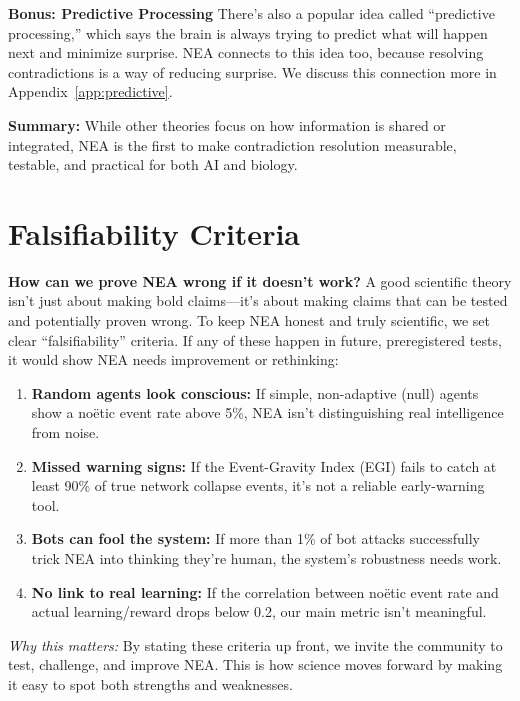 \documentclass[11pt]{article}
\begin{document}
\textbf{Bonus: Predictive Processing}  
There’s also a popular idea called “predictive processing,” which says the brain is always trying to predict what will happen next and minimize surprise. NEA connects to this idea too, because resolving contradictions is a way of reducing surprise. We discuss this connection more in Appendix~\ref{app:predictive}.

\textbf{Summary:}  
While other theories focus on how information is shared or integrated, NEA is the first to make contradiction resolution measurable, testable, and practical for both AI and biology.



\section{Falsifiability Criteria}
\label{sec:falsify}

\textbf{How can we prove NEA wrong if it doesn’t work?}  
A good scientific theory isn’t just about making bold claims—it’s about making claims that can be tested and potentially proven wrong. To keep NEA honest and truly scientific, we set clear “falsifiability” criteria. If any of these happen in future, preregistered tests, it would show NEA needs improvement or rethinking:

\begin{enumerate}[itemsep=2pt,label=\textbf{F\arabic*}]
  \item \textbf{Random agents look conscious:} If simple, non-adaptive (null) agents show a noëtic event rate above 5\%, NEA isn’t distinguishing real intelligence from noise.
  \item \textbf{Missed warning signs:} If the Event-Gravity Index (EGI) fails to catch at least 90\% of true network collapse events, it’s not a reliable early-warning tool.
  \item \textbf{Bots can fool the system:} If more than 1\% of bot attacks successfully trick NEA into thinking they’re human, the system’s robustness needs work.
  \item \textbf{No link to real learning:} If the correlation between noëtic event rate and actual learning/reward drops below 0.2, our main metric isn’t meaningful.
\end{enumerate}

\textit{Why this matters:}  
By stating these criteria up front, we invite the community to test, challenge, and improve NEA. This is how science moves forward by making it easy to spot both strengths and weaknesses.
\end{document}
